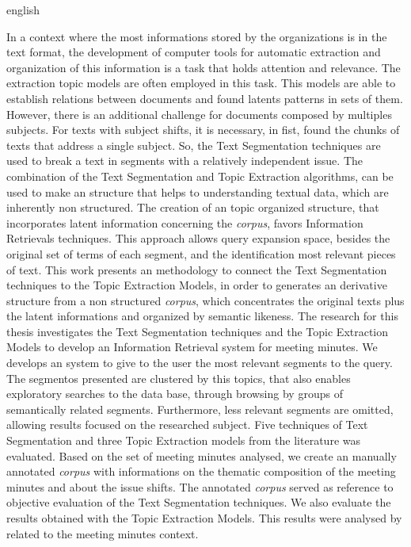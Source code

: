 \begin{resumo}[Abstract]
 \begin{otherlanguage*}{english}




In a context where the most informations stored by the organizations is in the text format, the development of computer tools for automatic extraction and organization of this information is a task that holds attention and relevance.
%
The extraction topic models are often employed in this task. This models are able  to establish relations between documents and found latents patterns in sets of them.  
However, there is an additional challenge for documents composed by multiples subjects. For texts with subject shifts, it is necessary, in fist, found the chunks of texts that address a single subject. So, the Text Segmentation techniques are used to break a text in segments with a relatively independent issue.  
The combination of the Text Segmentation and Topic Extraction algorithms, can be used to make an structure that helps to understanding textual data, which are inherently non structured.  
The creation of an topic organized structure, that incorporates latent information concerning the \textit{corpus}, favors Information Retrievals techniques. This approach allows query expansion space, besides the original set of terms of each segment, and the identification most relevant pieces of text.  
This work presents an methodology to connect the Text Segmentation techniques to the Topic Extraction Models, in order to generates an derivative structure from a non structured \textit{corpus}, which concentrates the original texts plus the latent informations and organized by semantic likeness.  
The research for this thesis investigates the Text Segmentation techniques and the Topic Extraction Models to develop an Information Retrieval system for meeting minutes.  
We develops an system to give to the user the most relevant segments to the query. The segmentos presented are clustered by this topics, that also enables exploratory searches to the data base, through browsing by groups of semantically related segments. Furthermore, less relevant segments are omitted, allowing results focused on the researched subject.  
Five techniques of Text Segmentation and three Topic Extraction models from the literature was evaluated. Based on the set of meeting minutes analysed, we create an manually annotated \textit{corpus} with informations on the thematic composition of the meeting minutes and about the issue shifts. The annotated \textit{corpus} served as reference to objective evaluation of the Text Segmentation techniques. We also evaluate the results obtained with the Topic Extraction Models. This results were analysed by related to the meeting minutes context.  

\end{otherlanguage*}
\end{resumo}
